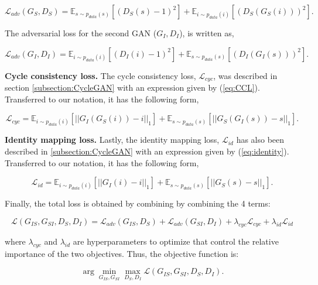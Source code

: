 \begin{equation}
    \mathcal{L}_{adv}(G_{S},D_S) = \mathbb{E}_{s \sim p_{data}(s)} [(D_S(s)-1)^2] + \mathbb{E}_{i \sim p_{data}(i)} [(D_S(G_{S}(i)))^2].
\end{equation}

The adversarial loss for the second GAN ($G_{I}, D_I$), is written as,

\begin{equation}
    \mathcal{L}_{adv}(G_{I},D_I) = \mathbb{E}_{i \sim p_{data}(i)} [(D_I(i)-1)^2] + \mathbb{E}_{s \sim p_{data}(s)} [(D_I(G_{I}(s)))^2].
\end{equation}

\textbf{Cycle consistency loss.} The cycle consistency loss, $\mathcal{L}_{cyc}$, was described in section \ref{subsection:CycleGAN} with an expression given by (\ref{eq:CCL}). Transferred to our notation, it has the following form,

\begin{equation} 
\mathcal{L}_{cyc} = \mathbb{E}_{i \sim p_{data}(i)} [||G_{I}(G_{S}(i))-i||_1] + \mathbb{E}_{s \sim p_{data}(s)} [||G_{S}(G_{I}(s))-s||_1].
\label{eq:cly_2}
\end{equation}

\textbf{Identity mapping loss.} Lastly, the identity mapping loss, $\mathcal{L}_{id}$ has also been described in \ref{subsection:CycleGAN} with an expression given by (\ref{eq:identity}). Transferred to our notation, it has the following form,

\begin{equation}
    \mathcal{L}_{id} = \mathbb{E}_{i \sim p_{data}(i)} [||G_{I}(i)-i||_1] +  \mathbb{E}_{s \sim p_{data}(s)} [||G_{S}(s)-s||_1].
\end{equation}

Finally, the total loss is obtained by combining by combining the 4 terms:

\begin{equation}
\label{eq:total-cyclegan-loss}
    \mathcal{L}(G_{IS},G_{SI},D_S,D_I) = \mathcal{L}_{adv}(G_{IS},D_S) + \mathcal{L}_{adv}(G_{SI},D_I) + \lambda_{cyc} \mathcal{L}_{cyc} + \lambda_{id} \mathcal{L}_{id}
\end{equation}

\noindent where $\lambda_{cyc}$ and $\lambda_{id}$ are hyperparameters to optimize that control the relative importance of the two objectives. Thus, the objective function is:

\begin{equation}
    \arg \min_{G_{IS},G_{SI}}\max_{D_S,D_I} \mathcal{L}(G_{IS},G_{SI},D_S,D_I).
\end{equation}

